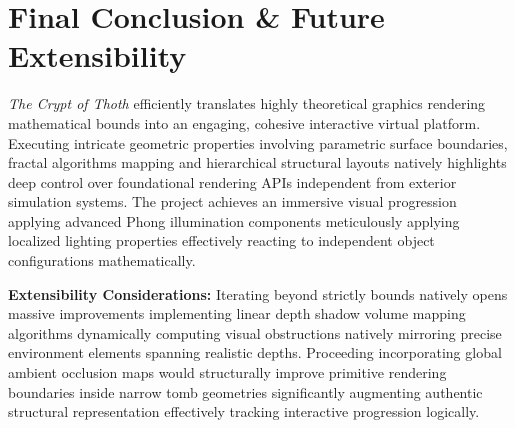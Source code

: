\documentclass[12pt, a4paper]{article}
\begin{document}
\newpage
\section{Final Conclusion \& Future Extensibility}
\textit{The Crypt of Thoth} efficiently translates highly theoretical graphics rendering mathematical bounds into an engaging, cohesive interactive virtual platform. Executing intricate geometric properties involving parametric surface boundaries, fractal algorithms mapping and hierarchical structural layouts natively highlights deep control over foundational rendering APIs independent from exterior simulation systems. The project achieves an immersive visual progression applying advanced Phong illumination components meticulously applying localized lighting properties effectively reacting to independent object configurations mathematically.

\textbf{Extensibility Considerations:} 
Iterating beyond strictly bounds natively opens massive improvements implementing linear depth shadow volume mapping algorithms dynamically computing visual obstructions natively mirroring precise environment elements spanning realistic depths. Proceeding incorporating global ambient occlusion maps would structurally improve primitive rendering boundaries inside narrow tomb geometries significantly augmenting authentic structural representation effectively tracking interactive progression logically.
\end{document}
